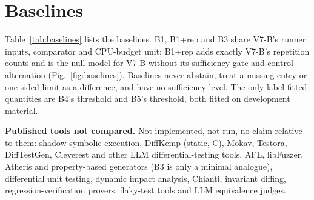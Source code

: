 \section{Baselines}\label{sec:baselines}
Table~\ref{tab:baselines} lists the baselines. B1, B1+rep and B3 share V7-B's runner, inputs, comparator and CPU-budget unit; B1+rep adds exactly V7-B's repetition counts and is the null model for V7-B without its sufficiency gate and control alternation (Fig.~\ref{fig:baselines}). Baselines never abstain, treat a missing entry or one-sided limit as a difference, and have no sufficiency level. The only label-fitted quantities are B4's threshold and B5's threshold, both fitted on development material.

\textbf{Published tools not compared.} Not implemented, not run, no claim relative to them: shadow symbolic execution, DiffKemp (static, C), Mokav, Testora, DiffTestGen, Cleverest and other LLM differential-testing tools, AFL, libFuzzer, Atheris and property-based generators (B3 is only a minimal analogue), differential unit testing, dynamic impact analysis, Chianti, invariant diffing, regression-verification provers, flaky-test tools and LLM equivalence judges.

